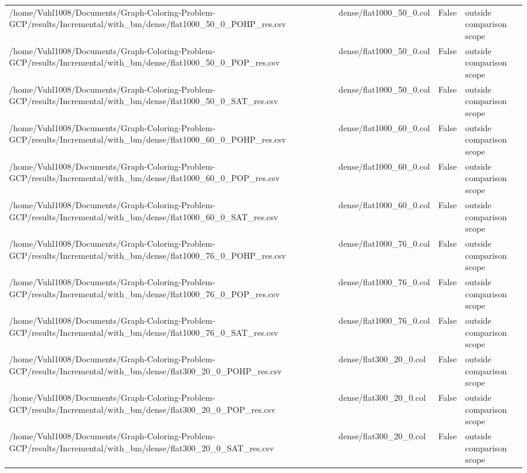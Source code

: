 \begin{table}[htbp]
\begin{tabular}{llll}
/home/Vuhl1008/Documents/Graph-Coloring-Problem-GCP/results/Incremental/with\_bm/dense/flat1000\_50\_0\_POHP\_res.csv & dense/flat1000\_50\_0.col & False & outside comparison scope \\
/home/Vuhl1008/Documents/Graph-Coloring-Problem-GCP/results/Incremental/with\_bm/dense/flat1000\_50\_0\_POP\_res.csv & dense/flat1000\_50\_0.col & False & outside comparison scope \\
/home/Vuhl1008/Documents/Graph-Coloring-Problem-GCP/results/Incremental/with\_bm/dense/flat1000\_50\_0\_SAT\_res.csv & dense/flat1000\_50\_0.col & False & outside comparison scope \\
/home/Vuhl1008/Documents/Graph-Coloring-Problem-GCP/results/Incremental/with\_bm/dense/flat1000\_60\_0\_POHP\_res.csv & dense/flat1000\_60\_0.col & False & outside comparison scope \\
/home/Vuhl1008/Documents/Graph-Coloring-Problem-GCP/results/Incremental/with\_bm/dense/flat1000\_60\_0\_POP\_res.csv & dense/flat1000\_60\_0.col & False & outside comparison scope \\
/home/Vuhl1008/Documents/Graph-Coloring-Problem-GCP/results/Incremental/with\_bm/dense/flat1000\_60\_0\_SAT\_res.csv & dense/flat1000\_60\_0.col & False & outside comparison scope \\
/home/Vuhl1008/Documents/Graph-Coloring-Problem-GCP/results/Incremental/with\_bm/dense/flat1000\_76\_0\_POHP\_res.csv & dense/flat1000\_76\_0.col & False & outside comparison scope \\
/home/Vuhl1008/Documents/Graph-Coloring-Problem-GCP/results/Incremental/with\_bm/dense/flat1000\_76\_0\_POP\_res.csv & dense/flat1000\_76\_0.col & False & outside comparison scope \\
/home/Vuhl1008/Documents/Graph-Coloring-Problem-GCP/results/Incremental/with\_bm/dense/flat1000\_76\_0\_SAT\_res.csv & dense/flat1000\_76\_0.col & False & outside comparison scope \\
/home/Vuhl1008/Documents/Graph-Coloring-Problem-GCP/results/Incremental/with\_bm/dense/flat300\_20\_0\_POHP\_res.csv & dense/flat300\_20\_0.col & False & outside comparison scope \\
/home/Vuhl1008/Documents/Graph-Coloring-Problem-GCP/results/Incremental/with\_bm/dense/flat300\_20\_0\_POP\_res.csv & dense/flat300\_20\_0.col & False & outside comparison scope \\
/home/Vuhl1008/Documents/Graph-Coloring-Problem-GCP/results/Incremental/with\_bm/dense/flat300\_20\_0\_SAT\_res.csv & dense/flat300\_20\_0.col & False & outside comparison scope \\

\end{tabular}
\end{table}
